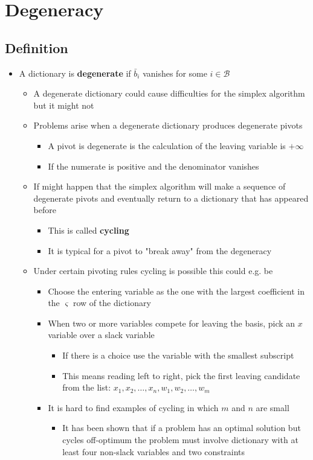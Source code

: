 \documentclass[11pt]{article}
\begin{document}
\section{Degeneracy}
\label{sec:org1a17b73}
\subsection{Definition}
\label{sec:org0876cc9}
\begin{itemize}
\item A dictionary is \textbf{degenerate} if \(\bar b_i\) vanishes for some \(i \in \mathcal B\)
\begin{itemize}
\item A degenerate dictionary could cause difficulties for the simplex algorithm but it might not
\item Problems arise when a degenerate dictionary produces degenerate pivots
\begin{itemize}
\item A pivot is degenerate is the calculation of the leaving variable is \(+ \infty\)
\item If the numerate is positive and the denominator vanishes
\end{itemize}
\item If might happen that the simplex algorithm will make a sequence of degenerate pivots and eventually return to a dictionary that has appeared before
\begin{itemize}
\item This is called \textbf{cycling}
\item It is typical for a pivot to "break away" from the degeneracy
\end{itemize}
\item Under certain pivoting rules cycling is possible this could e.g. be 
\begin{itemize}
\item Choose the entering variable as the one with the largest coefficient in the \(\varsigma\) row of the dictionary
\item When two or more variables compete for leaving the basis, pick an \(x\) variable over a slack variable
\begin{itemize}
\item If there is a choice use the variable with the smallest subscript
\item This means reading left to right, pick the first leaving candidate from the list: \(x_1,x_2, \dots, x_n, w_1, w_2, \dots, w_m\)
\end{itemize}
\item It is hard to find examples of cycling in which \(m\) and \(n\) are small
\begin{itemize}
\item It has been shown that if a problem has an optimal solution but cycles off-optimum the problem must involve dictionary with at least four non-slack variables and two constraints
\end{itemize}
\end{itemize}
\end{itemize}


\end{itemize}
\end{document}
